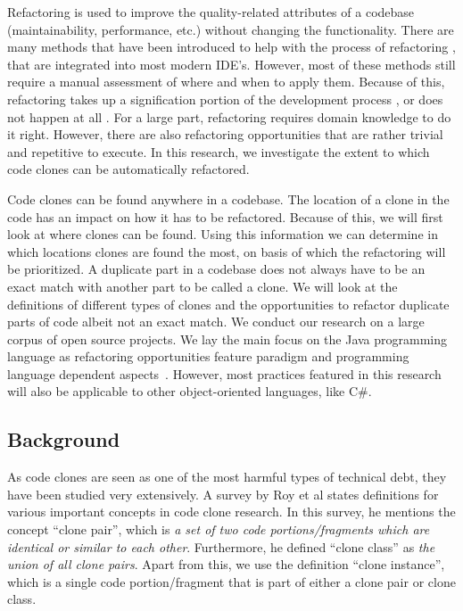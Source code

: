 \documentclass[a4paper]{article}
\begin{document}
Refactoring is used to improve the quality-related attributes of a codebase (maintainability, performance, etc.) without changing the functionality. There are many methods that have been introduced to help with the process of refactoring \cite{fowler1999refactoring, wake2004refactoring}, that are integrated into most modern IDE's. However, most of these methods still require a manual assessment of where and when to apply them. Because of this, refactoring takes up a signification portion of the development process \cite{lientz1978characteristics, mens2004survey}, or does not happen at all \cite{mens2003refactoring}. For a large part, refactoring requires domain knowledge to do it right. However, there are also refactoring opportunities that are rather trivial and repetitive to execute. In this research, we investigate the extent to which code clones can be automatically refactored.

Code clones can be found anywhere in a codebase. The location of a clone in the code has an impact on how it has to be refactored. Because of this, we will first look at where clones can be found. Using this information we can determine in which locations clones are found the most, on basis of which the refactoring will be prioritized. A duplicate part in a codebase does not always have to be an exact match with another part to be called a clone. We will look at the definitions of different types of clones and the opportunities to refactor duplicate parts of code albeit not an exact match. We conduct our research on a large corpus of open source projects. We lay the main focus on the Java programming language as refactoring opportunities feature paradigm and programming language dependent aspects~\cite{choi2011extracting}. However, most practices featured in this research will also be applicable to other object-oriented languages, like C\#.

\subsection{Background}
As code clones are seen as one of the most harmful types of technical debt, they have been studied very extensively. A survey by Roy et al \cite{roy2007survey} states definitions for various important concepts in code clone research. In this survey, he mentions the concept ``clone pair'', which is \textit{a set of two code portions/fragments which are identical or similar to each other}. Furthermore, he defined ``clone class'' as \textit{the union of all clone pairs}. Apart from this, we use the definition ``clone instance'', which is a single code portion/fragment that is part of either a clone pair or clone class.
\end{document}
